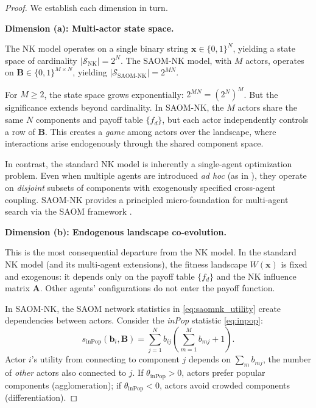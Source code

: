 \documentclass[12pt]{article}
\newcommand{\bx}{\mathbf{x}}
\newcommand{\bb}{\mathbf{b}}
\newcommand{\bB}{\mathbf{B}}
\newcommand{\bA}{\mathbf{A}}
\begin{document}
\begin{proof}
We establish each dimension in turn.

\medskip
\noindent\textbf{Dimension (a): Multi-actor state space.}

The NK model operates on a single binary string $\bx \in \{0,1\}^N$, yielding
a state space of cardinality $|\mathcal{S}_{\mathrm{NK}}| = 2^N$. The SAOM-NK
model, with $M$ actors, operates on $\bB \in \{0,1\}^{M \times N}$, yielding
$|\mathcal{S}_{\text{SAOM-NK}}| = 2^{MN}$.

For $M \geq 2$, the state space grows exponentially:
$2^{MN} = (2^N)^M$. But the significance extends beyond cardinality. In SAOM-NK,
the $M$ actors share the same $N$ components and payoff table $\{f_d\}$, but
each actor independently controls a row of $\bB$. This creates a \emph{game}
among actors over the landscape, where interactions arise endogenously through
the shared component space.

In contrast, the standard NK model is inherently a single-agent optimization
problem. Even when multiple agents are introduced \emph{ad hoc} (as in
\citealt{siggelkow2005speed}), they operate on \emph{disjoint} subsets of
components with exogenously specified cross-agent coupling. SAOM-NK provides
a principled micro-foundation for multi-agent search via the SAOM
framework \citep{snijders2010introduction}.

\medskip
\noindent\textbf{Dimension (b): Endogenous landscape co-evolution.}

This is the most consequential departure from the NK model. In the standard
NK model (and its multi-agent extensions), the fitness landscape $W(\bx)$
is fixed and exogenous: it depends only on the payoff table $\{f_d\}$ and
the NK influence matrix $\bA$. Other agents' configurations do not enter the
payoff function.

In SAOM-NK, the SAOM network statistics in \eqref{eq:saomnk_utility}
create dependencies between actors. Consider the \emph{inPop} statistic
\eqref{eq:inpop}:
\begin{equation*}
  s_{\mathrm{inPop}}(\bb_i, \bB) = \sum_{j=1}^{N} b_{ij}
    \left(\sum_{m=1}^{M} b_{mj} + 1\right).
\end{equation*}
Actor $i$'s utility from connecting to component $j$ depends on
$\sum_{m} b_{mj}$, the number of \emph{other} actors also connected to $j$.
If $\theta_{\mathrm{inPop}} > 0$, actors prefer popular components
(agglomeration); if $\theta_{\mathrm{inPop}} < 0$, actors avoid
crowded components (differentiation).


\end{proof}
\end{document}
